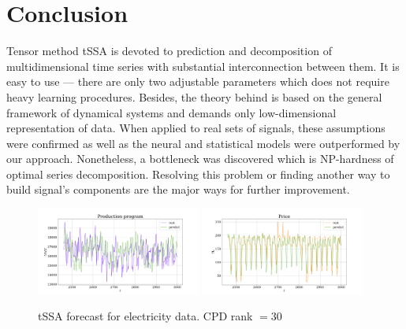 	\section{Conclusion}
	
		Tensor method tSSA is devoted to prediction and decomposition of multidimensional time series with substantial interconnection between them. It is easy to use --- there are only two adjustable parameters which does not require heavy learning procedures. Besides, the theory behind is based on the general framework of dynamical systems and demands only low-dimensional representation of data. When applied to real sets of signals, these assumptions were confirmed as well as the neural and statistical models were outperformed by our approach. Nonetheless, a bottleneck was discovered which is NP-hardness of optimal series decomposition. Resolving this problem or finding another way to build signal's components are the major ways for further improvement.
		
		\begin{figure}[h]
			\centering
			\includegraphics[width=0.48\textwidth, keepaspectratio]{../../experiments/electricity/tssa/figs/prediction/cpd_rank_30/Production_program.png}
			\includegraphics[width=0.48\textwidth, keepaspectratio]{../../experiments/electricity/tssa/figs/prediction/cpd_rank_30/Price.png}
			\caption{tSSA forecast for electricity data. CPD rank $ = 30 $}\label{fig:tssa_electr_pred}
		\end{figure}
		
